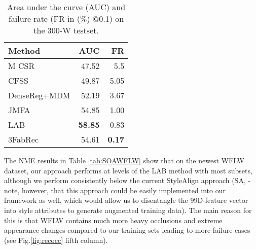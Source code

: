 \documentclass[10pt,twocolumn,letterpaper]{article}
\begin{document}
\begin{table}
	\footnotesize
	\begin{center}
		\begin{tabular}{l r r}
			\toprule
			\bf Method & AUC & FR  \\
			\toprule
			M CSR \cite{deng2016m3} & 47.52 &  5.5  \\
			CFSS \cite{zhu2015face}& 49.87 &  5.05  \\
			DenseReg+MDM \cite{alp2017densereg}& 52.19 &  3.67  \\
			JMFA \cite{deng2019joint}& 54.85 &  1.00  \\
LAB \cite{Wu2018}& \bf 58.85 &  0.83  \\
			\midrule
			3FabRec & 54.61 &  \bf 0.17 \\
			
			\bottomrule
		\end{tabular}	
	\end{center}
	\vspace{-0.5cm}
	\caption{\small Area under the curve (AUC) and failure rate (FR in (\%) @0.1) on the 300-W testset.}	
	\label{tab:AUCFR}
	\vspace{-0.4cm}\end{table}


The NME results in Table \ref{tab:SOAWFLW} show that on the newest WFLW dataset, our approach performs at levels of the LAB method \cite{Wu2018} with most subsets, although we perform consistently below the current StyleAlign approach (SA, \cite{Qian2019} - note, however, that this approach could be easily implemented into our framework as well, which would allow us to disentangle the 99D-feature vector into style attributes \cite{browatzki2019robust} to generate augmented training data). The main reason for this is that WFLW contains much more heavy occlusions and extreme appearance changes compared to our training sets leading to more failure cases (see Fig.\ref{fig:recocc} fifth column).
\end{document}
